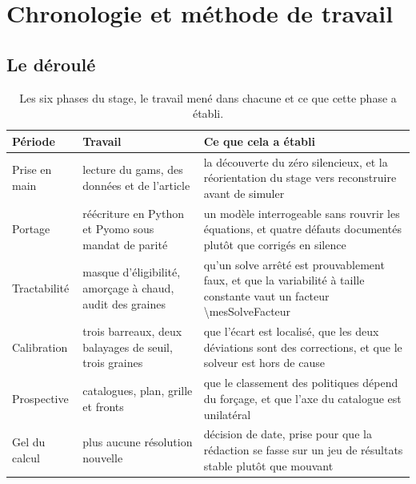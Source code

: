 ﻿\chapter{Chronologie et méthode de travail}
\label{ann:chronologie}

\section{Le déroulé}

\begin{table}[H]
  \centering
  \caption{Les six phases du stage, le travail mené dans chacune et ce que cette phase a
  établi.}
  \label{tab:ann-chrono}
  \small
  \begin{tabularx}{\textwidth}{@{}p{24mm}p{38mm}X@{}}
    \toprule
    \textbf{Période} & \textbf{Travail} & \textbf{Ce que cela a établi} \\
    \midrule
    Prise en main & lecture du \gls{gams}, des données et de l'article &
      la découverte du zéro silencieux, et la réorientation du stage vers reconstruire avant
      de simuler \\
    Portage & réécriture en Python et Pyomo sous mandat de parité &
      un modèle interrogeable sans rouvrir les équations, et quatre défauts documentés plutôt
      que corrigés en silence \\
    Tractabilité & masque d'éligibilité, amorçage à chaud, audit des graines &
      qu'un solve arrêté est prouvablement faux, et que la variabilité à taille constante vaut
      un facteur \num{\mesSolveFacteur} \\
    Calibration & trois barreaux, deux balayages de seuil, trois graines &
      que l'écart est localisé, que les deux déviations sont des corrections, et que le
      solveur est hors de cause \\
    Prospective & catalogues, plan, grille et fronts &
      que le classement des politiques dépend du forçage, et que l'axe du catalogue est
      unilatéral \\
    Gel du calcul & plus aucune résolution nouvelle &
      décision de date, prise pour que la rédaction se fasse sur un jeu de résultats stable
      plutôt que mouvant \\
    \bottomrule
  \end{tabularx}
\end{table}

